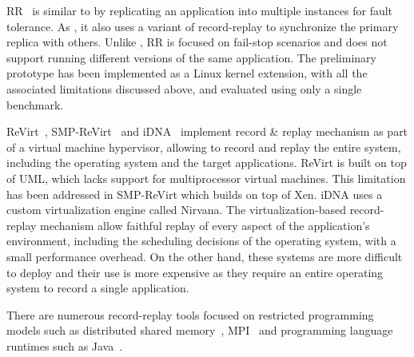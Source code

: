 RR~\cite{rr} is similar to \varan by replicating an application into multiple
instances for fault tolerance. As \varan, it also uses a variant of
record-replay to synchronize the primary replica with others. Unlike \varan, RR
is focused on fail-stop scenarios and does not support running different
versions of the same application. The preliminary prototype has been
implemented as a Linux kernel extension, with all the associated limitations
discussed above, and evaluated using only a single benchmark.

ReVirt~\cite{revirt}, SMP-ReVirt~\cite{smp-revirt} and iDNA~\cite{idna}
implement record \& replay mechanism as part of a virtual machine hypervisor,
allowing to record and replay the entire system, including the operating system
and the target applications. ReVirt is built on top of UML, which lacks support
for multiprocessor virtual machines. This limitation has been addressed in
SMP-ReVirt which builds on top of Xen. iDNA uses a custom virtualization engine
called Nirvana. The virtualization-based record-replay mechanism allow faithful
replay of every aspect of the application's environment, including the
scheduling decisions of the operating system, with a small performance
overhead.  On the other hand, these systems are more difficult to deploy and
their use is more expensive as they require an entire operating system to
record a single application.

There are numerous record-replay tools focused on restricted programming models
such as distributed shared memory~\cite{russinovich96}, MPI~\cite{rrmpi} and
programming language runtimes such as Java~\cite{choi98}.
